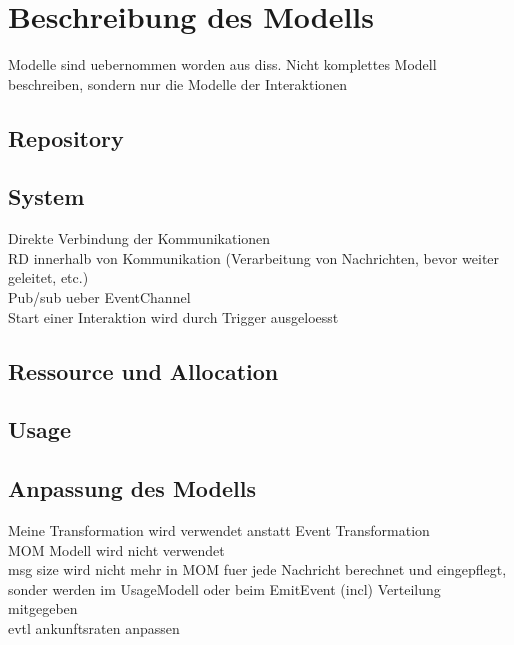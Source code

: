 \section{Beschreibung des Modells}
Modelle sind uebernommen worden aus diss. Nicht komplettes Modell beschreiben, sondern nur die Modelle der Interaktionen
\subsection{Repository}
\subsection{System}
Direkte Verbindung der Kommunikationen \\
RD innerhalb von Kommunikation (Verarbeitung von Nachrichten, bevor weiter geleitet, etc.)\\
Pub/sub ueber EventChannel \\
Start einer Interaktion wird durch Trigger ausgeloesst \\
\subsection{Ressource und Allocation}
\subsection{Usage}


\subsection{Anpassung des Modells}
Meine Transformation wird verwendet anstatt Event Transformation \\
MOM Modell wird nicht verwendet\\
msg size wird nicht mehr in MOM fuer jede Nachricht berechnet und eingepflegt, sonder werden im UsageModell oder beim EmitEvent (incl) Verteilung mitgegeben \\

evtl ankunftsraten anpassen

